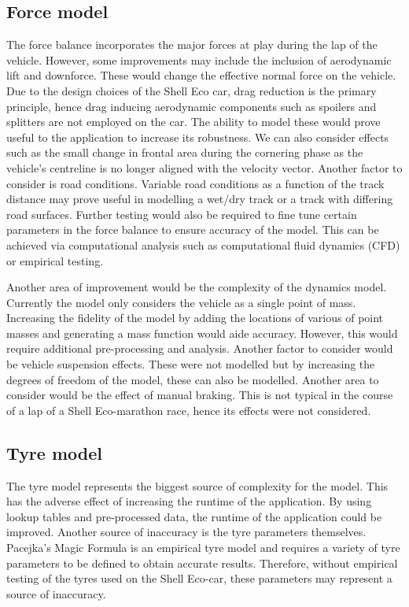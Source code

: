 \documentclass[11pt]{article}
\numberwithin{equation}{section}
\begin{document}
\subsection{Force model}
The force balance incorporates the major forces at play during the lap of the vehicle. However, some improvements may include the inclusion of aerodynamic lift and downforce. These would change the effective normal force on the vehicle. Due to the design choices of the Shell Eco car, drag reduction is the primary principle, hence drag inducing aerodynamic components such as spoilers and splitters are not employed on the car. The ability to model these would prove useful to the application to increase its robustness. We can also consider effects such as the small change in frontal area during the cornering phase as the vehicle's centreline is no longer aligned with the velocity vector. Another factor to consider is road conditions. Variable road conditions as a function of the track distance may prove useful in modelling a wet/dry track or a track with differing road surfaces. Further testing would also be required to fine tune certain parameters in the force balance to ensure accuracy of the model. This can be achieved via computational analysis such as computational fluid dynamics (CFD) or empirical testing.

Another area of improvement would be the complexity of the dynamics model. Currently the model only considers the vehicle as a single point of mass. Increasing the fidelity of the model by adding the locations of various of point masses and generating a mass function would aide accuracy. However, this would require additional pre-processing and analysis. Another factor to consider would be vehicle suspension effects. These were not modelled but by increasing the degrees of freedom of the model, these can also be modelled. Another area to consider would be the effect of manual braking. This is not typical in the course of a lap of a Shell Eco-marathon race, hence its effects were not considered. 

\subsection{Tyre model}
The tyre model represents the biggest source of complexity for the model. This has the adverse effect of increasing the runtime of the application. By using lookup tables and pre-processed data, the runtime of the application could be improved. Another source of inaccuracy is the tyre parameters themselves. Pacejka's Magic Formula is an empirical tyre model and requires a variety of tyre parameters to be defined to obtain accurate results. Therefore, without empirical testing of the tyres used on the Shell Eco-car, these parameters may represent a source of inaccuracy. 
\end{document}

